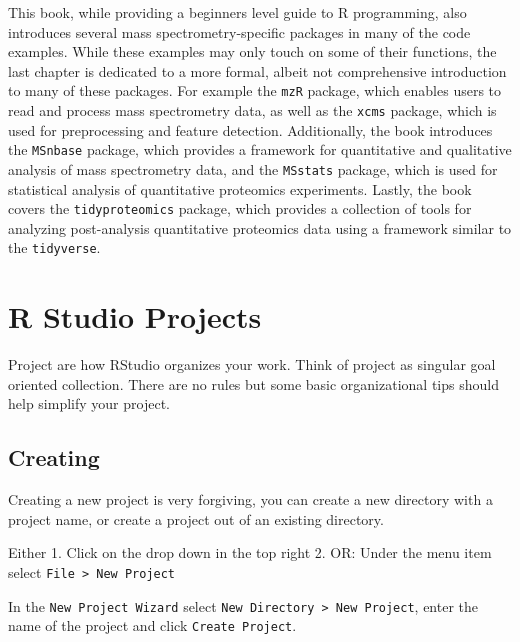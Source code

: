 \documentclass[
]{book}
\begin{document}
This book, while providing a beginners level guide to R programming, also introduces several mass spectrometry-specific packages in many of the code examples. While these examples may only touch on some of their functions, the last chapter is dedicated to a more formal, albeit not comprehensive introduction to many of these packages. For example the \texttt{mzR} package, which enables users to read and process mass spectrometry data, as well as the \texttt{xcms} package, which is used for preprocessing and feature detection. Additionally, the book introduces the \texttt{MSnbase} package, which provides a framework for quantitative and qualitative analysis of mass spectrometry data, and the \texttt{MSstats} package, which is used for statistical analysis of quantitative proteomics experiments. Lastly, the book covers the \texttt{tidyproteomics} package, which provides a collection of tools for analyzing post-analysis quantitative proteomics data using a framework similar to the \texttt{tidyverse}.

\hypertarget{r-studio-projects}{%
\chapter{R Studio Projects}\label{r-studio-projects}}

Project are how RStudio organizes your work. Think of project as singular goal oriented collection. There are no rules but some basic organizational tips should help simplify your project.

\hypertarget{creating}{%
\section{Creating}\label{creating}}

Creating a new project is very forgiving, you can create a new directory with a project name, or create a project out of an existing directory.

Either 1. Click on the drop down in the top right 2. OR: Under the menu item select \texttt{File\ \textgreater{}\ New\ Project}

In the \texttt{New\ Project\ Wizard} select \texttt{New\ Directory\ \textgreater{}\ New\ Project}, enter the name of the project and click \texttt{Create\ Project}.
\end{document}
